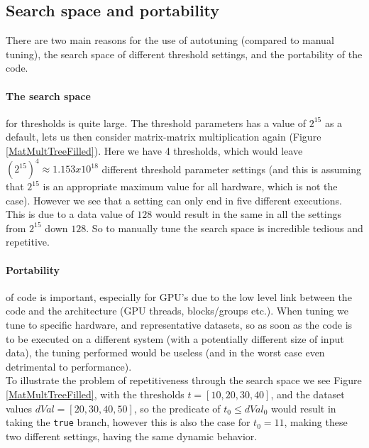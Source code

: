 \subsection{Search space and portability}
There are two main reasons for the use of autotuning (compared to manual tuning), the search space of different threshold settings, and the portability of the code.
\paragraph{The search space} for thresholds is quite large. The threshold parameters has a value of $2^{15}$ as a default, lets us then consider matrix-matrix multiplication again (Figure \ref{MatMultTreeFilled}). Here we have 4 thresholds, which would leave $(2^{15})^4 \approx 1.153x10^{18}$ different threshold parameter settings (and this is assuming that $2^{15}$ is an appropriate maximum value for all hardware, which is not the case). However we see that a setting can only end in five different executions. This is due to a data value of $128$ would result in the same in all the settings from $2^{15}$ down $128$. So to manually tune the search space is incredible tedious and repetitive.
\paragraph{Portability} of code is important, especially for GPU's due to the low level link between the code and the architecture (GPU threads, blocks/groups etc.). When tuning we tune to specific hardware, and representative datasets, so as soon as the code is to be executed on a different system (with a potentially different size of input data), the tuning performed would be useless (and in the worst case even detrimental to performance).\\

To illustrate the problem of repetitiveness through the search space we see Figure \ref{MatMultTreeFilled}, with the thresholds $t = [10, 20, 30, 40]$, and the dataset values $dVal = [20, 30, 40, 50]$, so the predicate of $t_0 \leq dVal_0$ would result in taking the \texttt{true} branch, however this is also the case for $t_0 = 11$, making these two different settings, having the same dynamic behavior.